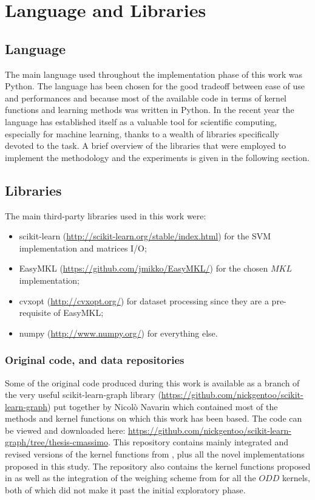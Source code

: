 \chapter{Language and Libraries}
\label{AppendixB}

\section{Language}
\label{sec:language}

The main language used throughout the implementation phase of this work was
Python.
The language has been chosen for the good tradeoff between ease of use and
performances and because most of the available code in terms of kernel functions 
and learning methods was written in Python.
In the recent year the language has established itself as a valuable tool for
scientific computing, especially for machine learning, thanks to a wealth
of libraries specifically devoted to the task.
A brief overview of the libraries that were employed to implement the methodology
and the experiments is given in the following section.

\section{Libraries}
\label{sec:libraries}
The main third-party libraries used in this work were:
\begin{itemize}
    \item scikit-learn (\url{http://scikit-learn.org/stable/index.html}) for the
        SVM implementation and matrices I/O;
    \item EasyMKL (\url{https://github.com/jmikko/EasyMKL/}) for the chosen $MKL$
        implementation;
    \item cvxopt (\url{http://cvxopt.org/}) for dataset processing since they are
        a pre-requisite of EasyMKL;
    \item numpy (\url{http://www.numpy.org/}) for everything else.
\end{itemize}

\subsection{Original code, and data repositories}
\label{subsec:repos}
Some of the original code produced during this work is available as a branch of the 
very useful scikit-learn-graph library (\url{https://github.com/nickgentoo/scikit-learn-graph})
put together by Nicol\`o Navarin which contained most of the methods and kernel
functions on which this work has been based.
The code can be viewed and downloaded here: \url{https://github.com/nickgentoo/scikit-learn-graph/tree/thesis-cmassimo}.
This repository contains mainly integrated and revised versions of the kernel functions from \cite{rtesselli},
plus all the novel implementations proposed in this study.
The repository also contains the kernel functions proposed in \cite{SanMartino2014}
as well as the integration of the weighing scheme from \cite{DaSanMartino2016} for all the $ODD$ kernels,
both of which did not make it past the initial exploratory phase.

